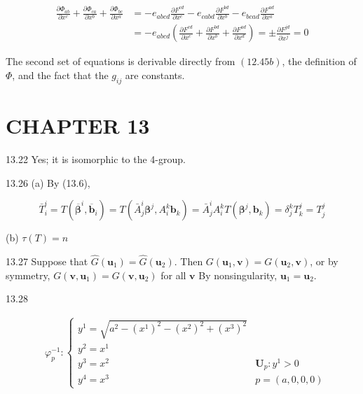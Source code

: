 \documentclass[10pt]{article}
\begin{document}
$$
\begin{aligned}
\frac{\partial \Phi_{a b}}{\partial x^{c}}+\frac{\partial \Phi_{c a}}{\partial x^{b}}+\frac{\partial \Phi_{b c}}{\partial x^{a}} & =-e_{a b c d} \frac{\partial F^{c d}}{\partial x^{c}}-e_{c a b d} \frac{\partial F^{b d}}{\partial x^{b}}-e_{b c a d} \frac{\partial F^{a d}}{\partial x^{a}} \\
& =-e_{a b c d}\left(\frac{\partial F^{c d}}{\partial x^{c}}+\frac{\partial F^{b d}}{\partial x^{b}}+\frac{\partial F^{a d}}{\partial x^{d}}\right)= \pm \frac{\partial F^{j d}}{\partial x^{j}}=0
\end{aligned}
$$

The second set of equations is derivable directly from $(12.45 b)$, the definition of $\Phi$, and the fact that the $g_{i j}$ are constants.

\section*{CHAPTER 13}
13.22 Yes; it is isomorphic to the 4-group.

13.26 (a) By (13.6),

$$
\bar{T}_{i}^{i}=T\left(\overline{\boldsymbol{\beta}}^{i}, \overline{\mathbf{b}}_{i}\right)=T\left(\bar{A}_{j}^{i} \boldsymbol{\beta}^{j}, A_{i}^{k} \mathbf{b}_{k}\right)=\bar{A}_{j}^{i} A_{i}^{k} T\left(\boldsymbol{\beta}^{j}, \mathbf{b}_{k}\right)=\delta_{j}^{k} T_{k}^{j}=T_{j}^{j}
$$

(b) $\tau(T)=n$

13.27 Suppose that $\hat{G}\left(\mathbf{u}_{1}\right)=\hat{G}\left(\mathbf{u}_{2}\right)$. Then $G\left(\mathbf{u}_{1}, \mathbf{v}\right)=G\left(\mathbf{u}_{2}, \mathbf{v}\right)$, or by symmetry, $G\left(\mathbf{v}, \mathbf{u}_{1}\right)=G\left(\mathbf{v}, \mathbf{u}_{2}\right)$ for all $\mathbf{v}$ By nonsingularity, $\mathbf{u}_{1}=\mathbf{u}_{2}$.

13.28

$$
\begin{aligned}
& \varphi_{p}^{-1}: \begin{cases}y^{1}=\sqrt{a^{2}-\left(x^{1}\right)^{2}-\left(x^{2}\right)^{2}+\left(x^{3}\right)^{2}} \\
y^{2}=x^{1} & \\
y^{3}=x^{2} & \mathbf{U}_{p}: y^{1}>0 \\
y^{4}=x^{3} & p=(a, 0,0,0)\end{cases}
\end{aligned}
$$
\end{document}
